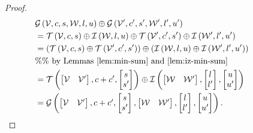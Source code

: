 %
\begin{proof}
  \begin{align*}
& \mathcal{G}\left(\mathcal{V},c,s,\mathcal{W},l,u\right)\oplus \mathcal{G}\left(\mathcal{V}^\prime,c^\prime,s^\prime,\mathcal{W}^\prime,l^\prime,u^\prime\right)\\
& =
    \mathit{\operatorname{\mathcal{T}}}\left(\mathcal{V},c,s\right)\oplus \mathit{\operatorname{\mathcal{I}}}\left(\mathcal{W},l,u\right)
    \oplus\mathit{\operatorname{\mathcal{T}}}\left(\mathcal{V}^\prime,c^\prime,s^\prime\right)\oplus \mathit{\operatorname{\mathcal{I}}}\left(\mathcal{W}^\prime,l^\prime,u^\prime\right)\\
&
    =\left(\mathit{\operatorname{\mathcal{T}}}\left(\mathcal{V},c,s\right)\oplus \mathit{\operatorname{\mathcal{T}}}\left(\mathcal{V}^\prime,c^\prime,s^\prime\right)\right)
    \oplus\left(\mathit{\operatorname{\mathcal{I}}}\left(\mathcal{W},l,u\right)\oplus \mathit{\operatorname{\mathcal{I}}}\left(\mathcal{W}^\prime,l^\prime,u^\prime\right)\right)\\
    & \%\%~\text{by Lemmas~\ref{lem:min-sum} and~\ref{lem:iz-min-sum}}\\
& = \mathit{\operatorname{\mathcal{T}}}\left(\begin{bmatrix}\mathcal{V} &
          \mathcal{V}^\prime\end{bmatrix},c+c^\prime,\begin{bmatrix}s\\s^\prime\end{bmatrix}\right)\oplus \mathit{\operatorname{\mathcal{I}}}\left(\left[\begin{matrix}\mathcal{W} &
                   \mathcal{W}^\prime\end{matrix}\right],\left[\begin{matrix}l\\l^\prime\end{matrix}\right],\left[\begin{matrix}u\\u^\prime\end{matrix}\right]\right)\\
& =  \mathcal{G}\left(\left[\begin{matrix}
    \mathcal{V} &
    \mathcal{V}^\prime
  \end{matrix}\right]
,\begin{matrix}
    c+c^\prime
  \end{matrix}
,\left[\begin{matrix}
    s\\
    s^\prime
  \end{matrix}\right]
,\left[\begin{matrix}
    \mathcal{W} &
    \mathcal{W}^\prime
  \end{matrix}\right]
,\left[\begin{matrix}
    l\\
    l^\prime
  \end{matrix}\right]
,\left[\begin{matrix}
    u\\
    u^\prime
  \end{matrix}\right]
\right).~~~~~~~~~~~~~~~~~~~\qedhere            
    \end{align*}
%
\end{proof}
